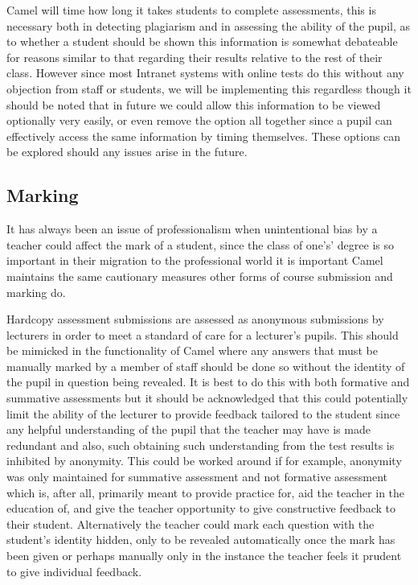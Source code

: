 Camel will time how long it takes students to complete assessments, this is necessary both in detecting plagiarism and in assessing the ability of the pupil, as to whether a student should be shown this information is somewhat debateable for reasons similar to that regarding their results relative to the rest of their class. However since most Intranet systems with online tests do this without any objection from staff or students, we will be implementing this regardless though it should be noted that in future we could allow this information to be viewed optionally very easily, or even remove the option all together since a pupil can effectively access the same information by timing themselves. These options can be explored should any issues arise in the future.

\subsection*{Marking}
It has always been an issue of professionalism when unintentional bias by a teacher could affect the mark of a student, since the class of one's’ degree is so important in their migration to the professional world it is important Camel maintains the same cautionary measures other forms of course submission and marking do.

Hardcopy assessment submissions are assessed as anonymous submissions by lecturers in order to meet a standard of care for a lecturer’s pupils. This should be mimicked in the functionality of Camel where any answers that must be manually marked by a member of staff should be done so without the identity of the pupil in question being revealed. It is best to do this with both formative and summative assessments but it should be acknowledged that this could potentially limit the ability of the lecturer to provide feedback tailored to the student since any helpful understanding of the pupil that the teacher may have is made redundant and also, such obtaining such understanding from the test results is inhibited by anonymity. This could be worked around if for example, anonymity was only maintained for summative assessment and not formative assessment which is, after all, primarily meant to provide practice for, aid the teacher in the education of, and give the teacher opportunity to give constructive feedback to their student. Alternatively the teacher could mark each question with the student’s identity hidden, only to be revealed automatically once the mark has been given or perhaps manually only in the instance the teacher feels it prudent to give individual feedback.

